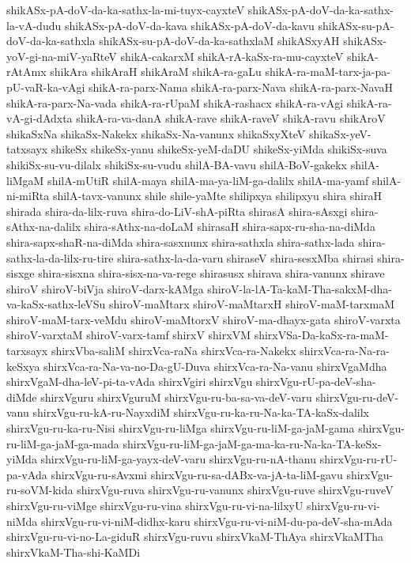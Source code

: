 {shikASx-pA-doV-da-ka-sathx-la-mi-tuyx-cayxteV
shikASx-pA-doV-da-ka-sathx-la-vA-dudu
shikASx-pA-doV-da-kava
shikASx-pA-doV-da-kavu
shikASx-su-pA-doV-da-ka-sathxla
shikASx-su-pA-doV-da-ka-sathxlaM
shikASxyAH
shikASx-yoV-gi-na-miV-yaRteV
shikA-cakarxM
shikA-rA-kaSx-ra-mu-cayxteV
shikA-rAtAmx
shikAra
shikAraH
shikAraM
shikA-ra-gaLu
shikA-ra-maM-tarx-ja-pa-pU-vaR-ka-vAgi
shikA-ra-parx-Nama
shikA-ra-parx-Nava
shikA-ra-parx-NavaH
shikA-ra-parx-Na-vada
shikA-ra-rUpaM
shikA-rashacx
shikA-ra-vAgi
shikA-ra-vA-gi-dAdxta
shikA-ra-va-danA
shikA-rave
shikA-raveV
shikA-ravu
shikAroV
shikaSxNa
shikaSx-Nakekx
shikaSx-Na-vanunx
shikaSxyXteV
shikaSx-yeV-tatxsayx
shikeSx
shikeSx-yanu
shikeSx-yeM-daDU
shikeSx-yiMda
shikiSx-suva
shikiSx-su-vu-dilalx
shikiSx-su-vudu
shilA-BA-vavu
shilA-BoV-gakekx
shilA-liMgaM
shilA-mUtiR
shilA-maya
shilA-ma-ya-liM-ga-dalilx
shilA-ma-yamf
shilA-ni-miRta
shilA-tavx-vanunx
shile
shile-yaMte
shilipxya
shilipxyu
shira
shiraH
shirada
shira-da-lilx-ruva
shira-do-LiV-shA-piRta
shirasA
shira-sAsxgi
shira-sAthx-na-dalilx
shira-sAthx-na-doLaM
shirasaH
shira-sapx-ru-sha-na-diMda
shira-sapx-shaR-na-diMda
shira-sasxnunx
shira-sathxla
shira-sathx-lada
shira-sathx-la-da-lilx-ru-tire
shira-sathx-la-da-varu
shiraseV
shira-sesxMba
shirasi
shira-sisxge
shira-sisxna
shira-sisx-na-va-rege
shirasusx
shirava
shira-vanunx
shirave
shiroV
shiroV-biVja
shiroV-darx-kAMga
shiroV-la-lA-Ta-kaM-Tha-sakxM-dha-va-kaSx-sathx-leVSu
shiroV-maMtarx
shiroV-maMtarxH
shiroV-maM-tarxmaM
shiroV-maM-tarx-veMdu
shiroV-maMtorxV
shiroV-ma-dhayx-gata
shiroV-varxta
shiroV-varxtaM
shiroV-varx-tamf
shirxV
shirxVM
shirxVSa-Da-kaSx-ra-maM-tarxsayx
shirxVba-saliM
shirxVca-raNa
shirxVca-ra-Nakekx
shirxVca-ra-Na-ra-keSxya
shirxVca-ra-Na-va-no-Da-gU-Duva
shirxVca-ra-Na-vanu
shirxVgaMdha
shirxVgaM-dha-leV-pi-ta-vAda
shirxVgiri
shirxVgu
shirxVgu-rU-pa-deV-sha-diMde
shirxVguru
shirxVguruM
shirxVgu-ru-ba-sa-va-deV-varu
shirxVgu-ru-deV-vanu
shirxVgu-ru-kA-ru-NayxdiM
shirxVgu-ru-ka-ru-Na-ka-TA-kaSx-dalilx
shirxVgu-ru-ka-ru-Nisi
shirxVgu-ru-liMga
shirxVgu-ru-liM-ga-jaM-gama
shirxVgu-ru-liM-ga-jaM-ga-mada
shirxVgu-ru-liM-ga-jaM-ga-ma-ka-ru-Na-ka-TA-keSx-yiMda
shirxVgu-ru-liM-ga-yayx-deV-varu
shirxVgu-ru-nA-thanu
shirxVgu-ru-rU-pa-vAda
shirxVgu-ru-sAvxmi
shirxVgu-ru-sa-dABx-va-jA-ta-liM-gavu
shirxVgu-ru-soVM-kida
shirxVgu-ruva
shirxVgu-ru-vanunx
shirxVgu-ruve
shirxVgu-ruveV
shirxVgu-ru-viMge
shirxVgu-ru-vina
shirxVgu-ru-vi-na-lilxyU
shirxVgu-ru-vi-niMda
shirxVgu-ru-vi-niM-didhx-karu
shirxVgu-ru-vi-niM-du-pa-deV-sha-mAda
shirxVgu-ru-vi-no-La-giduR
shirxVgu-ruvu
shirxVkaM-ThAya
shirxVkaMTha
shirxVkaM-Tha-shi-KaMDi
}
